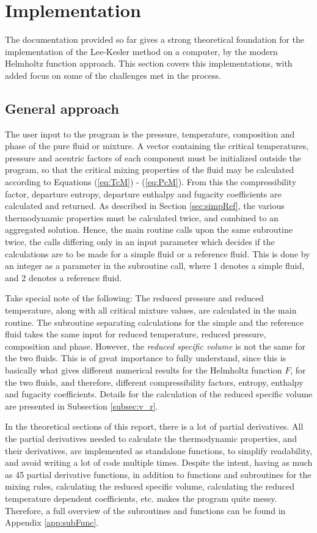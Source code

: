 \documentclass[internal,english]{sintefmemo2012}
\numberwithin{equation}{section}
\newcommand*{\reff}[1]{(\ref{#1})}
\begin{document}
\section{Implementation}
The documentation provided so far gives a strong theoretical foundation for the implementation of the Lee-Kesler method on a computer, by the modern Helmholtz function approach. This section covers this implementations, with added focus on some of the challenges met in the process. 

\subsection{General approach}
The user input to the program is the pressure, temperature, composition and phase of the pure fluid or mixture. A vector containing the critical temperatures, pressure and acentric factors of each component must be initialized outside the program, so that the critical mixing properties of the fluid may be calculated according to Equations \reff{eq:TcM} - \reff{eq:PcM}. From this the compressibility factor, departure entropy, departure enthalpy and fugacity coefficients are calculated and returned. As described in Section \ref{sec:simpRef}, the various thermodynamic properties must be calculated twice, and combined to an aggregated solution. Hence, the main routine calls upon the same subroutine twice, the calls differing only in an input parameter which decides if the calculations are to be made for a simple fluid or a reference fluid. This is done by an integer as a parameter in the subroutine call, where 1 denotes a simple fluid, and 2 denotes a reference fluid.

Take special note of the following: The reduced pressure and reduced temperature, along with all critical mixture values, are calculated in the main routine. The subroutine separating calculations for the simple and the reference fluid takes the same input for reduced temperature, reduced pressure, composition and phase. However, the \textit{reduced specific volume} is not the same for the two fluids. This is of great importance to fully understand, since this is basically what gives different numerical results for the Helmholtz function $F$, for the two fluids, and therefore, different compressibility factors, entropy, enthalpy and fugacity coefficients. Details for the calculation of the reduced specific volume are presented in Subsection \ref{subsec:v_r}.

In the theoretical sections of this report, there is a lot of partial derivatives. All the partial derivatives needed to calculate the thermodynamic properties, and their derivatives, are implemented as standalone functions, to simplify readability, and avoid writing a lot of code multiple times. Despite the intent, having as much as 45 partial derivative functions, in addition to functions and subroutines for the mixing rules, calculating the reduced specific volume, calculating the reduced temperature dependent coefficients, etc. makes the program quite messy. Therefore, a full overview of the subroutines and functions can be found in Appendix \ref{app:subFunc}.
\end{document}
